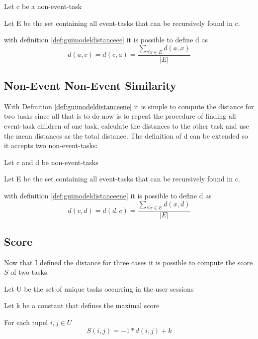 \begin{definition}
	\item Let c be a non-event-task
	\item Let E be the set containing all event-tasks that can be recursively found in c.
	\item with definition \ref{def:guimodeldistanceee} it is possible to define d as
\begin{equation*}
	d(a,c) = d(c,a) = \frac{\sum_{\forall x \in E} d(a,x)}{|E|}
\end{equation*}
\label{def:guimodeldistanceene}
\end{definition}

\subsection{Non-Event Non-Event Similarity}
With Definition \ref{def:guimodeldistanceene} it is simple to compute the distance for two tasks since all that is to do now is to repeat the procedure of finding all event-task children of one task, calculate the distances to the other task and use the mean distances as the total distance.
The definition of d can be extended so it accepts two non-event-tasks:

\begin{definition}
	\item Let c and d be non-event-tasks 
	\item Let E be the set containing all event-tasks that can be recursively found in c.
	\item with definition \ref{def:guimodeldistanceene} it is possible to define d as
	\begin{equation*}
		d(c,d) = d(d,c) = \frac{\sum_{\forall x \in E} d(x,d)}{|E|}
	\end{equation*}
\label{def:guimodeldistancenene}
\end{definition}
\subsection{Score}
Now that I defined the distance for three cases it is possible to compute the score $S$ of two tasks.
\begin{definition}
	\item Let U be the set of unique tasks occurring in the user sessions
	\item Let k be a constant that defines the maximal score 
	\item For each tupel $i,j \in U$ 
\begin{equation*}
		 S(i,j) = -1*d(i,j)+k
	\label{eq:subscore}
\end{equation*}
\label{def:scorewithmaximalscore}
\end{definition}

